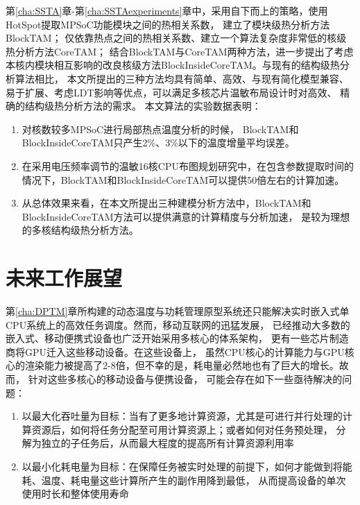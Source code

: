 第\ref{cha:SSTA}章-第\ref{cha:SSTAexperiments}章中，采用自下而上的策略，使用HotSpot提取MPSoC功能模块之间的热相关系数， 建立了模块级热分析方法BlockTAM； 仅依靠热点之间的热相关系数、建立一个算法复杂度非常低的核级热分析方法CoreTAM； 结合BlockTAM与CoreTAM两种方法，进一步提出了考虑本核内模块相互影响的改良核级方法BlockInsideCoreTAM。与现有的结构级热分析算法相比， 本文所提出的三种方法均具有简单、高效、与现有简化模型兼容、易于扩展、考虑LDT影响等优点，可以满足多核芯片温敏布局设计时对高效、 精确的结构级热分析方法的需求。
本文算法的实验数据表明：
\begin{enumerate}[1)]
\item 对核数较多MPSoC进行局部热点温度分析的时候， BlockTAM和BlockInsideCoreTAM只产生2\%、3\%以下的温度增量平均误差。
\item 在采用电压频率调节的温敏16核CPU布图规划研究中，在包含参数提取时间的情况下，BlockTAM和BlockInsideCoreTAM可以提供50倍左右的计算加速。
\item 从总体效果来看，在本文所提出三种建模分析方法中，BlockTAM和BlockInsideCoreTAM方法可以提供满意的计算精度与分析加速， 是较为理想的多核结构级热分析方法。
\end{enumerate}

\section{未来工作展望}
第\ref{cha:DPTM}章所构建的动态温度与功耗管理原型系统还只能解决实时嵌入式单CPU系统上的高效任务调度。然而，移动互联网的迅猛发展， 已经推动大多数的嵌入式、移动便携式设备也广泛开始采用多核心的体系架构， 更有一些芯片制造商将GPU迁入这些移动设备。在这些设备上， 虽然CPU核心的计算能力与GPU核心的渲染能力被提高了2-8倍，但不幸的是，耗电量必然地也有了巨大的增长。故而， 针对这些多核心的移动设备与便携设备， 可能会存在如下一些亟待解决的问题：
\begin{enumerate}[1)]
\item 以最大化吞吐量为目标：当有了更多地计算资源，尤其是可进行并行处理的计算资源后，如何将任务分配至可用计算资源上；或者如何对任务预处理， 分解为独立的子任务后，从而最大程度的提高所有计算资源利用率
\item 以最小化耗电量为目标：在保障任务被实时处理的前提下，如何才能做到将能耗、温度、耗电量这些计算所产生的副作用降到最低， 从而提高设备的单次使用时长和整体使用寿命
\end{enumerate}

